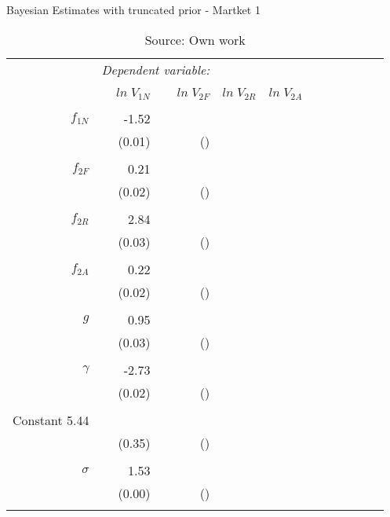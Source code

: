 \begin{table}[ht]
\caption{Bayesian Estimates with truncated prior - Martket 1}
\centering
\begin{tabular}{rrrrrrrrrrr}
  \toprule 
 & \multicolumn{2}{c}{\textit{Dependent variable:}} \\ 
\cline{2-3} 
\\[-1.8ex] & $ln \; V_{1N}$ & $ln \; V_{2F}$ & $ln \; V_{2R}$ & $ln \; V_{2A}$ \\ 
\hline \\[-1.8ex] 
  $f_{1N}$ & -1.52 & \\
           & (0.01)  & () \\
& & \\
  $f_{2F}$ & 0.21 & \\
  		     & (0.02)  & () \\
& & \\
  $f_{2R}$ & 2.84 &  \\
  			   & (0.03) &  () \\
& & \\  
  $f_{2A}$ & 0.22 & \\
           & (0.02)  & () \\
& & \\
  $g$ & 0.95 & \\
  		& (0.03) & () \\
& & \\
  $\gamma$ & -2.73 &  \\
  			& (0.02) & () \\
& & \\  
  Constant 5.44 &  &  \\
  			& (0.35) & () \\
& & \\  
  \hline
  $\sigma$ & 1.53 &  \\
  		 & (0.00) & () \\
& & \\
\bottomrule
\end{tabular}
\caption*{Source: Own work}
\end{table}
